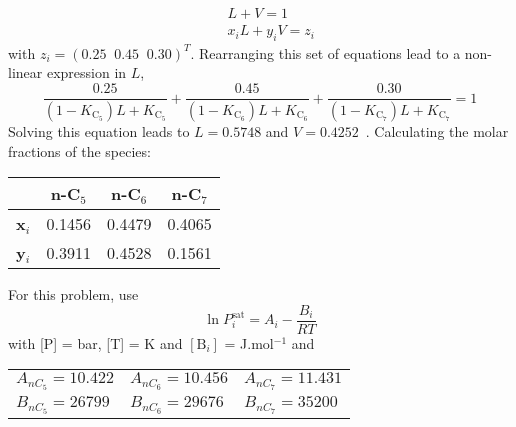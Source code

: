 \documentclass[calculator,allquestions,datasheet,resit]{exam_newMarcus2}
\newcommand{\frc}{\displaystyle\frac}
\begin{document}
\begin{question}
\begin{enumerate}[(a)]
{\begin{eqnarray}
&& L + V = 1 \nonumber \\
&& x_{i}L + y_{i}V = z_{i} \nonumber 
\end{eqnarray}
with $z_{i}=\left(0.25\;\;0.45\;\;0.30\right)^{T}$. Rearranging this set of equations lead to a non-linear expression in $L$,~
\begin{displaymath}
\frc{0.25}{\left(1-K_{\text{C}_{5}}\right)L+K_{\text{C}_{5}}} + \frc{0.45}{\left(1-K_{\text{C}_{6}}\right)L+K_{\text{C}_{6}}} +  \frc{0.30}{\left(1-K_{\text{C}_{7}}\right)L+K_{\text{C}_{7}}} = 1 
\end{displaymath}
Solving this equation leads to $L=0.5748$ and $V=0.4252$~. Calculating the molar fractions of the species:~
\begin{center}
\begin{tabular}{c c c c}
\hline
                 & {\bf n-C$_{5}$} &  {\bf n-C$_{6}$} &  {\bf n-C$_{7}$} \\
\hline
  {\bf x$_{i}$}   & 0.1456         &  0.4479         & 0.4065    \\
  {\bf y$_{i}$}   &  0.3911        &  0.4528         & 0.1561    \\
\hline
\end{tabular} 
\end{center}}

%
\end{enumerate}

For this problem, use 
\begin{displaymath}
   \ln P_{i}^{\text{sat}} = A_{i} - \frc{B_{i}}{RT}
\end{displaymath} 
with [P] = bar, [T] = K and $\left[\text{B}_{i}\right]$ = J.mol$^{-1}$ and
    \begin{center}
       \begin{tabular}{l l l} 
          $A_{nC_{5}}=10.422$ & $A_{nC_{6}}=10.456$ & $A_{nC_{7}}=11.431$ \\
          $B_{nC_{5}}=26799$  & $B_{nC_{6}}=29676$  & $B_{nC_{7}}=35200$  
       \end{tabular}
    \end{center}
%
\end{question}

\clearpage
\end{document}
